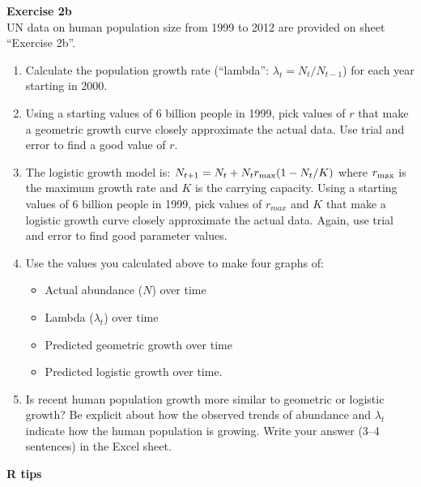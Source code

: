 \documentclass[12pt]{article}\usepackage[]{graphicx}\usepackage[]{xcolor}
\begin{document}
\vspace{24pt}

{\bf Exercise 2b \\}
UN data on human population size from 1999 to 2012 are provided on
sheet ``Exercise 2b''.


\begin{enumerate}
  \item Calculate the population growth rate (``lambda'':
    $\lambda_t = N_{t}/N_{t-1}$) for each year starting in 2000.
  \item Using a starting values of 6 billion people in 1999, pick
    values of $r$ that make a geometric growth curve
    closely approximate the actual data. Use trial and error to find a
    good value of $r$. 
  \item The logistic growth model is: 
    $N_{t+1} = N_t + N_t r_{\rm max}(1 - N_t/K)$ where $r_{\rm max}$
    is the maximum growth rate and $K$ is the carrying capacity.
    Using a starting values of 6 billion people in 1999, pick
    values of $r_{max}$ and $K$ that make a logistic growth curve
    closely approximate the actual data. Again, use trial and error to
    find good parameter values. 
  \item Use the values you calculated above to make four graphs of:
    \begin{itemize}
      \item Actual abundance ($N$) over time
      \item Lambda ($\lambda_t$) over time
      \item Predicted geometric growth over time
      \item Predicted logistic growth over time.
    \end{itemize}
  \item Is recent human population growth more similar to geometric or
    logistic growth? Be explicit about how the observed trends of
    abundance and $\lambda_t$ indicate how the human population is
    growing. Write your answer (3--4 sentences) in the Excel sheet.
\end{enumerate}



\newpage

{\bf R tips \\}
\end{document}
